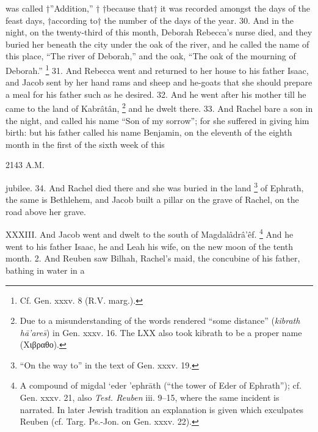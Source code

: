 was called †''Addition,'' † †because that† it was recorded amongst the days of the feast days, †according to† the number of the days of the year. 30. And in the night, on the twenty-third of this month, Deborah Rebecca's nurse died, and they buried her beneath the city under the oak of the river, and he called the name of this place, ``The river of Deborah,'' and the oak, ``The oak of the mourning of Deborah.'' \footnote{Cf. Gen. xxxv. 8 (R.V. marg.).} 31. And Rebecca went and returned to her house to his father Isaac, and Jacob sent by her hand rams and sheep and he-goats that she should prepare a meal for his father such as he desired. 32. And he went after his mother till he came to the land of Kabrâtân, \footnote{Due to a misunderstanding of the words rendered ``some distance'' (\emph{kibrath hā’are\={s}}) in Gen. xxxv. 16. The LXX also took kibrath to be a proper name (\textgreek{Χιβραθο}).} and he dwelt there. 33. And Rachel bare a son in the night, and called his name ``Son of my sorrow''; for she suffered in giving him birth: but his father called his name Benjamin, on the eleventh of the eighth month in the first of the sixth week of this

2143 A.M.

jubilee. 34. And Rachel died there and she was buried in the land \footnote{``On the way to'' in the text of Gen. xxxv. 19.} of Ephrath, the same is Bethlehem, and Jacob built a pillar on the grave of Rachel, on the road above her grave.


XXXIII. And Jacob went and dwelt to the south of Magdalâdrâ’êf. \footnote{A compound of migdal ‘eder ’ephrāth (``the tower of Eder of Ephrath''); cf. Gen. xxxv. 21, also \emph{Test. Reuben} iii. 9--15, where the same incident is narrated. In later Jewish tradition an explanation is given which exculpates Reuben (cf. Targ. Ps.-Jon. on Gen. xxxv. 22).} And he went to his father Isaac, he and Leah his wife, on the new moon of the tenth month. 2. And Reuben saw Bilhah, Rachel's maid, the concubine of his father, bathing in water in a

